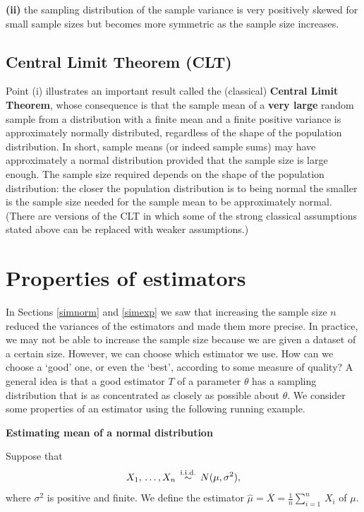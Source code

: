 \documentclass[
  british,
  11pt,
  openany, a4paper]{book}
\begin{document}
\textbf{(ii)} the sampling distribution of the sample variance is very positively skewed for small sample sizes but becomes more symmetric as the sample size increases.

\subsection{Central Limit Theorem (CLT)}\label{central-limit-theorem-clt}

Point (i) illustrates an important result called the (classical) \textbf{Central Limit Theorem}, whose consequence is that the sample mean of a \textbf{very large} random sample from a distribution with a finite mean and a finite positive variance is approximately normally distributed, regardless of the shape of the population distribution. In short, sample means (or indeed sample sums) may have approximately a normal distribution provided that the sample size is large enough. The sample size required depends on the shape of the population distribution: the closer the population distribution is to being normal the smaller is the sample size needed for the sample mean to be approximately normal. (There are versions of the CLT in which some of the strong classical assumptions stated above can be replaced with weaker assumptions.)

\section{Properties of estimators}\label{good}

In Sections \ref{simnorm} and \ref{simexp} we saw that increasing the sample size \(n\) reduced the variances of the estimators and made them more precise. In practice, we may not be able to increase the sample size because we are given a dataset of a certain size. However, we can choose which estimator we use. How can we choose a `good' one, or even the `best', according to some measure of quality? A general idea is that a good estimator \(T\) of a parameter \(\theta\) has a sampling distribution that is as concentrated as closely as possible about \(\theta\). We consider some properties of an estimator using the following running example.

\textbf{Estimating mean of a normal distribution}

Suppose that
\[X_1, \,\ldots,X_n \,\stackrel{{\rm i.i.d.}}{\sim}\, N(\mu,\sigma^2),\]
where \(\sigma^2\) is positive and finite. We define the estimator \(\hat{\mu}=\overline{X}=\displaystyle\frac{1}{n}\sum_{i=1}^n\,X_i\) of \(\mu\).
\end{document}
